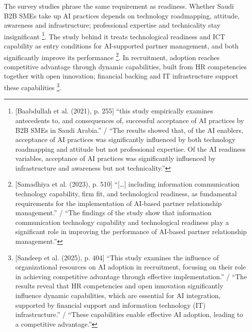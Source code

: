 The survey studies phrase the same requirement as readiness. Whether Saudi B2B SMEs take up AI practices depends on technology roadmapping, attitude, awareness and infrastructure; professional expertise and technicality stay insignificant \parencite[p.~255]{baabdullah2021smes}\footnote{[Baabdullah et al. (2021), p. 255] ``this study empirically examines antecedents to, and consequences of, successful acceptance of AI practices by B2B SMEs in Saudi Arabia.'' / ``The results showed that, of the AI enablers, acceptance of AI practices was significantly influenced by both technology roadmapping and attitude but not professional expertise. Of the AI readiness variables, acceptance of AI practices was significantly influenced by infrastructure and awareness but not technicality.''}. The study behind it treats technological readiness and ICT capability as entry conditions for AI-supported partner management, and both significantly improve its performance \parencite[p.~510]{samadhiya2023artificial}\footnote{[Samadhiya et al. (2023), p. 510] ``[\dots] including information communication technology capability, firm fit, and technological readiness, as fundamental requirements for the implementation of AI-based partner relationship management.'' / ``The findings of the study show that information communication technology capability and technological readiness play a significant role in improving the performance of AI-based partner relationship management.''}. In recruitment, adoption reaches competitive advantage through dynamic capabilities, built from HR competencies together with open innovation; financial backing and IT infrastructure support these capabilities \parencite[p.~404]{sandeep2025leveraging}\footnote{[Sandeep et al. (2025), p. 404] ``This study examines the influence of organizational resources on AI adoption in recruitment, focusing on their role in achieving competitive advantage through effective implementation.'' / ``The results reveal that HR competencies and open innovation significantly influence dynamic capabilities, which are essential for AI integration, supported by financial support and information technology (IT) infrastructure.'' / ``These capabilities enable effective AI adoption, leading to a competitive advantage.''}.

